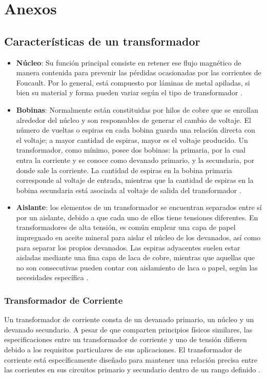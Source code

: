 \section{Anexos}
\subsection{Características de un transformador}

\begin{itemize}
    \item \textbf{Núcleo}: Su función principal consiste en retener ese flujo magnético de manera contenida para prevenir las pérdidas ocasionadas por las corrientes de Foucault. Por lo general, está compuesto por láminas de metal apiladas, si bien su material y forma pueden variar según el tipo de transformador \cite{ferrovial_stem}.
    \item \textbf{Bobinas}: Normalmente están constituidas por hilos de cobre que se enrollan alrededor del núcleo y son responsables de generar el cambio de voltaje. El número de vueltas o espiras en cada bobina guarda una relación directa con el voltaje; a mayor cantidad de espiras, mayor es el voltaje producido. Un transformador, como mínimo, posee dos bobinas: la primaria, por la cual entra la corriente y se conoce como devanado primario, y la secundaria, por donde sale la corriente. La cantidad de espiras en la bobina primaria corresponde al voltaje de entrada, mientras que la cantidad de espiras en la bobina secundaria está asociada al voltaje de salida del transformador \cite{ferrovial_stem}.
    \item \textbf{Aislante}: los elementos de un transformador se encuentran separados entre sí por un aislante, debido a que cada uno de ellos tiene tensiones diferentes. En transformadores de alta tensión, es común emplear una capa de papel impregnado en aceite mineral para aislar el núcleo de los devanados, así como para separar los propios devanados. Las espiras adyacentes suelen estar aisladas mediante una fina capa de laca de cobre, mientras que aquellas que no son consecutivas pueden contar con aislamiento de laca o papel, según las necesidades específica \cite{ferrovial_stem}.
\end{itemize}

\subsubsection{Transformador de Corriente}

Un transformador de corriente consta de un devanado primario, un núcleo y un devanado secundario. A pesar de que comparten principios físicos similares, las especificaciones entre un transformador de corriente y uno de tensión difieren debido a los requisitos particulares de sus aplicaciones. El transformador de corriente está específicamente diseñado para mantener una relación precisa entre las corrientes en sus circuitos primario y secundario dentro de un rango definido \cite{wiki_transformador_corriente}.

